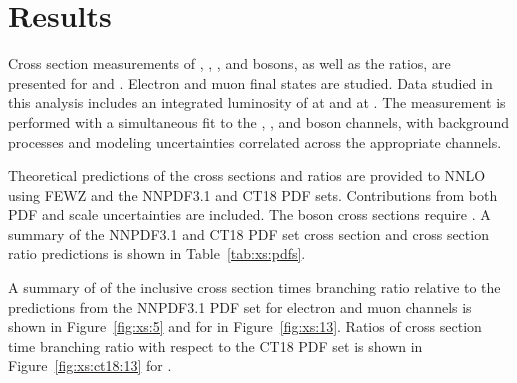 \chapter{Results}\label{ch:results}
Cross section measurements of \Wp, \Wm, \W, and \Z bosons, as well as the ratios, are presented for \serag and \serah. Electron and muon final states are studied. Data studied in this analysis includes an integrated luminosity of \lumig at \serag and \lumih at \serah. The measurement is performed with a simultaneous fit to the \Wp, \Wm, and \Z boson channels, with background processes and modeling uncertainties correlated across the appropriate channels. 

Theoretical predictions of the cross sections and ratios are provided to NNLO using FEWZ and the NNPDF3.1 and CT18 PDF sets. Contributions from both PDF and scale uncertainties are included. The \Z boson cross sections require \masswindow. A summary of the NNPDF3.1 and CT18 PDF set cross section and cross section ratio predictions is shown in Table~\ref{tab:xs:pdfs}.



A summary of of the inclusive cross section times branching ratio relative to the predictions from the NNPDF3.1 PDF set for \serag electron and muon channels is shown in Figure~\ref{fig:xs:5} and for \serah in Figure~\ref{fig:xs:13}. Ratios of cross section time branching ratio with respect to the CT18 PDF set is shown in Figure~\ref{fig:xs:ct18:13} for \serah.



%

% 
% 





